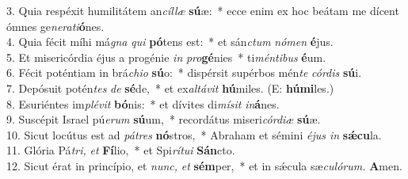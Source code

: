 3. Quia respéxit humilitátem an\textit{cíllæ} \textbf{sú}æ: * ecce enim ex hoc beátam me dícent ómnes ge\textit{nerati}\textbf{ó}nes.\\
4. Quia fécit míhi má\textit{gna} \textit{qui} \textbf{pó}tens est: * et sán\textit{ctum} \textit{nómen} \textbf{é}jus.\\
5. Et misericórdia éjus a progénie \textit{in} \textit{pro}\textbf{gé}nies * ti\textit{méntibus} \textbf{é}um.\\
6. Fécit poténtiam in brá\textit{chi}\textit{o} \textbf{sú}o: * dispérsit supérbos mén\textit{te} \textit{cór}\textit{dis} \textbf{sú}i.\\
7. Depósuit potén\textit{tes} \textit{de} \textbf{sé}de, * et ex\textit{altávit} \textbf{hú}miles. (E: \textbf{húmi}les.)\\
8. Esuriéntes im\textit{plé}\textit{vit} \textbf{bó}nis: * et dívites di\textit{mísit} \textit{in}\textbf{á}nes.\\
9. Suscépit Israel pú\textit{erum} \textbf{sú}um, * recordátus miseri\textit{córdiæ} \textbf{sú}æ.\\
10. Sicut locútus est ad \textit{pátres} \textbf{nó}stros, * Abraham et sémini \textit{éjus in} \textbf{sǽcu}la.\\
11. Glória Pá\textit{tri,} \textit{et} \textbf{Fí}lio, * et Spi\textit{rítui} \textbf{Sán}cto.\\
12. Sicut érat in princípio, et \textit{nunc,} \textit{et} \textbf{sém}per, * et in sǽcula sæ\textit{culórum.} \textbf{A}men.\\